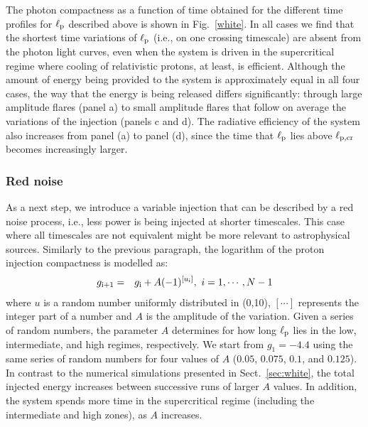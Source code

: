 \documentclass[fleqn,usenatbib]{mnras}
\newcommand{\eqb}{\begin{eqnarray}}
\newcommand{\eqe}{\end{eqnarray}}
\newcommand{\lp}{\ell_{\rm p}}
\newcommand{\lpcr}{\ell_{\rm p,cr}}
\begin{document}
{The photon compactness as a function of time obtained for the different time profiles for $\lp$ described above
is shown in Fig.~\ref{white}. In all cases we find that the shortest time variations of $\lp$  (i.e., on one crossing timescale) are absent from the photon light curves, even when  the system is driven in the supercritical regime where cooling of relativistic protons, at least, is efficient.
Although the amount of energy being provided to the system is approximately equal in all four cases,
the way that the energy is being released differs significantly: through large amplitude flares (panel a)
to small amplitude flares that follow on average the variations of the injection (panels c and d).
The radiative efficiency of the system also increases from panel (a) to panel (d), since the time that $\lp$ lies above $\lpcr$ becomes increasingly larger. 

  
\subsubsection{Red noise}\label{sec:red}
As a next step, we introduce a variable injection that can be described by a
red noise process, i.e., less power is being injected at shorter
timescales. This case where all timescales are not equivalent might be more
relevant to astrophysical sources. Similarly to the previous paragraph, the logarithm of the proton injection compactness is modelled
as:
\eqb
g_{\rm i+1} & = &  g_{\rm i} + A(-1)^{[u_{\rm i}]},\ i=1,\cdots, N-1 
\label{eq:red}
\eqe
where $u$ is a random number uniformly distributed in (0,10), $[\cdots]$ represents the integer
part of a number and $A$ is the amplitude of the variation.
Given a series of random numbers, the parameter $A$ determines 
for how long $\lp$ lies in the low, intermediate, and high regimes, respectively.
We start from $g_1=-4.4$ using the same series of random numbers for
four values of $A$ ($0.05$, $0.075$, $0.1$, and  $0.125$).
In contrast to the numerical simulations presented in Sect.~\ref{sec:white}, the total injected energy
increases between successive runs of larger $A$ values. In addition, the system spends more time in the supercritical regime (including the intermediate and high zones), as $A$ increases. 

}
\end{document}
